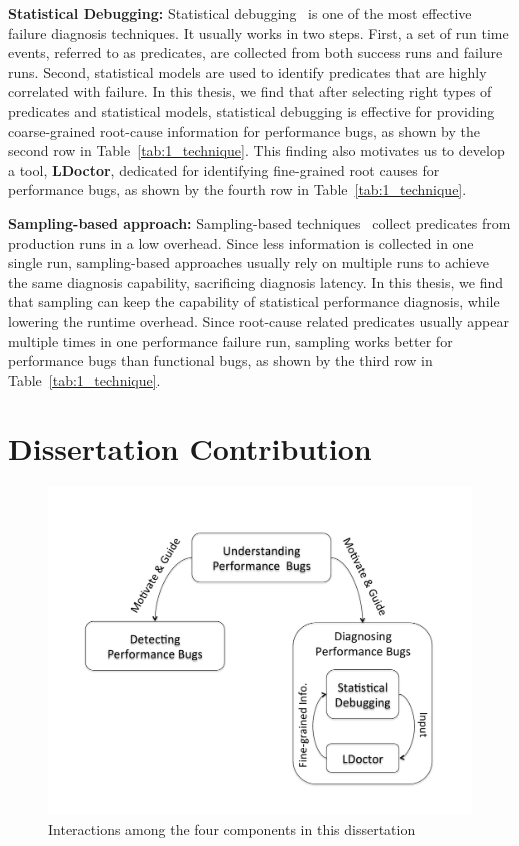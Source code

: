 {\bf Statistical Debugging:}
Statistical debugging~\citep{liblit03,liblit05,CCI,tarantula1,tarantula2,tarantula.darko,joy.asplos13} 
is one of the most effective failure diagnosis techniques. 
It usually works in two steps. 
First, a set of run time events, referred to as predicates, are collected from both success runs and failure runs.
Second, statistical models are used to identify predicates that are highly correlated with failure. 
In this thesis, we find that after selecting right types of predicates and statistical models, 
statistical debugging is effective for providing coarse-grained root-cause information for performance bugs, 
as shown by the second row in Table~\ref{tab:1_technique}. 
This finding also motivates us to develop a tool, {\bf LDoctor}, 
dedicated for identifying fine-grained root causes for performance bugs, as shown by the fourth row in Table~\ref{tab:1_technique}.

{\bf Sampling-based approach:}
Sampling-based techniques~\citep{liblit03,liblit05,CCI,joy.asplos13} collect predicates from production runs in a low overhead. 
Since less information is collected in one single run, 
sampling-based approaches usually rely on multiple runs to achieve the same diagnosis capability, 
sacrificing diagnosis latency. 
In this thesis, we find that sampling can keep the capability of statistical performance diagnosis, 
while lowering the runtime overhead. 
Since root-cause related predicates usually appear multiple times in one performance failure run, 
sampling works better for performance bugs than functional bugs, 
as shown by the third row in Table~\ref{tab:1_technique}. 

\section{Dissertation Contribution}


\begin{figure}[t!]
\begin{center}
\includegraphics[width=4.5in]{figures/overview}
\caption{Interactions among the four components in this dissertation}
\label{fig:overview}
\end{center}
\end{figure}

